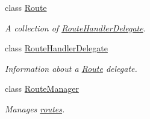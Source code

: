 \begin{DoxyCompactItemize}
class \hyperlink{classCqrs_1_1Bus_1_1Route}{Route}
\begin{DoxyCompactList}\small\item\em A collection of \hyperlink{classCqrs_1_1Bus_1_1RouteHandlerDelegate}{Route\+Handler\+Delegate}. \end{DoxyCompactList}\item 
class \hyperlink{classCqrs_1_1Bus_1_1RouteHandlerDelegate}{Route\+Handler\+Delegate}
\begin{DoxyCompactList}\small\item\em Information about a \hyperlink{classCqrs_1_1Bus_1_1Route}{Route} delegate. \end{DoxyCompactList}\item 
class \hyperlink{classCqrs_1_1Bus_1_1RouteManager}{Route\+Manager}
\begin{DoxyCompactList}\small\item\em Manages \hyperlink{classCqrs_1_1Bus_1_1Route}{routes}. \end{DoxyCompactList}\end{DoxyCompactItemize}
